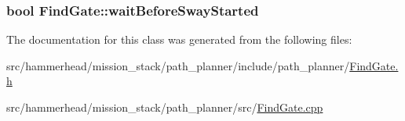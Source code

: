 \subsubsection[{\texorpdfstring{wait\+Before\+Sway\+Started}{waitBeforeSwayStarted}}]{\setlength{\rightskip}{0pt plus 5cm}bool Find\+Gate\+::wait\+Before\+Sway\+Started}\hypertarget{classFindGate_ab9f4c3d8f8d3a862561f48e41808a5c6}{}\label{classFindGate_ab9f4c3d8f8d3a862561f48e41808a5c6}


The documentation for this class was generated from the following files\+:\begin{DoxyCompactItemize}
\item 
src/hammerhead/mission\+\_\+stack/path\+\_\+planner/include/path\+\_\+planner/\hyperlink{FindGate_8h}{Find\+Gate.\+h}\item 
src/hammerhead/mission\+\_\+stack/path\+\_\+planner/src/\hyperlink{FindGate_8cpp}{Find\+Gate.\+cpp}\end{DoxyCompactItemize}
